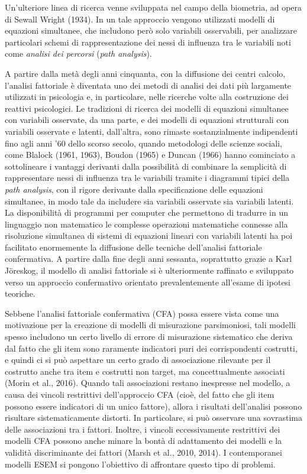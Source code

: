 Un'ulteriore linea di ricerca venne sviluppata nel campo della biometria, ad opera di Sewall Wright (1934). 
In un tale approccio vengono utilizzati modelli di equazioni simultanee, che includono però solo variabili osservabili, per analizzare particolari schemi di rappresentazione dei nessi di influenza tra le variabili noti come \emph{analisi dei percorsi} (\emph{path analysis}). 

A partire dalla metà degli anni cinquanta, con la diffusione dei centri calcolo, l'analisi fattoriale è diventata uno dei metodi di analisi dei dati più largamente utilizzati in psicologia e, in particolare, nelle ricerche volte alla costruzione dei reattivi psicologici.  
Le tradizioni di ricerca dei modelli di equazioni simultanee con variabili osservate, da una parte, e dei modelli di equazioni strutturali con variabili osservate e latenti, dall'altra, sono rimaste sostanzialmente indipendenti fino agli anni '60 dello scorso secolo, quando metodologi delle scienze sociali, come Blalock (1961, 1963), Boudon (1965) e Duncan (1966) hanno cominciato a sottolineare i vantaggi derivanti dalla possibilità di combinare la semplicità di rappresentare nessi di influenza tra le variabili tramite i diagrammi tipici della \emph{path analysis}, con il rigore derivante dalla specificazione delle equazioni simultanee, in modo tale da includere sia variabili osservate sia variabili latenti. 
La disponibilità di programmi per computer che permettono di tradurre in un linguaggio non matematico le complesse operazioni matematiche connesse alla risoluzione simultanea di sistemi di equazioni lineari con variabili latenti ha poi facilitato enormemente la diffusione delle tecniche dell'analisi fattoriale confermativa. 
A partire dalla fine degli anni sessanta, soprattutto grazie a Karl J\"oreskog, il modello di analisi fattoriale si è ulteriormente raffinato e sviluppato verso un approccio confermativo orientato prevalentemente all'esame di ipotesi teoriche.

Sebbene l'analisi fattoriale confermativa (CFA) possa essere vista come una motivazione per la creazione di modelli di misurazione parsimoniosi, tali modelli spesso includono un certo livello di errore di misurazione sistematico che deriva dal fatto che gli item sono raramente indicatori puri dei corrispondenti costrutti, e quindi ci si può aspettare un certo grado di associazione rilevante per il costrutto anche tra item e costrutti non target, ma concettualmente associati (Morin et al., 2016). 
Quando tali associazioni restano inespresse nel modello, a causa dei vincoli restrittivi dell'approccio CFA (cioè, del fatto che gli item possono essere indicatori di un unico fattore), allora i risultati dell'analisi possono risultare sistematicamente distorti.
In particolare, si può osservare una sovrastima delle associazioni tra i fattori. 
Inoltre, i vincoli eccessivamente restrittivi dei modelli CFA possono anche minare la bontà di adattamento dei modelli e la validità discriminante dei fattori (Marsh et al., 2010, 2014).
I contemporanei modelli ESEM si pongono l'obiettivo di affrontare questo tipo di problemi.

